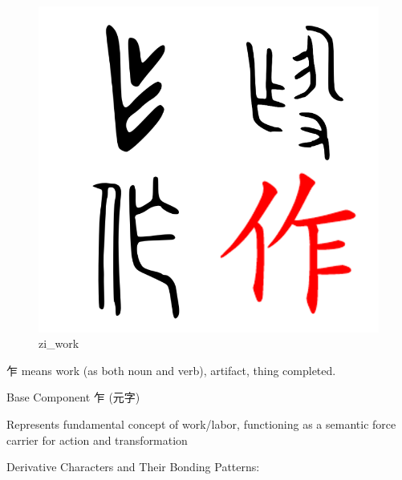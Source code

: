 \documentclass[
  11pt,
  letterpaper,
]{article}
\begin{document}
\begin{figure}
\centering
\includegraphics{./images/zi_work.png}
\caption{zi\_work}
\end{figure}

乍 means work (as both noun and verb), artifact, thing completed.

Base Component 乍 (元字)

Represents fundamental concept of work/labor, functioning as a semantic
force carrier for action and transformation

Derivative Characters and Their Bonding Patterns:
\end{document}
